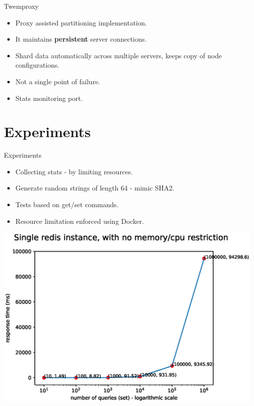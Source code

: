 \documentclass{beamer}
\begin{document}
\begin{frame}{Twemproxy}
\begin{itemize}
    \item Proxy assisted partitioning implementation.
    \item It maintains \textbf{persistent} server connections.
    \item Shard data automatically across multiple servers, keeps copy of node configurations.
    \item Not a single point of failure.
    \item Stats monitoring port.
\end{itemize}
\end{frame}

\section{Experiments}

\begin{frame}{Experiments}
\begin{itemize}
    \item Collecting stats - by limiting resources.
    \item Generate random strings of length 64 - mimic SHA2.
    \item Tests based on get/set commands.
    \item Resource limitation enforced using Docker.
\end{itemize}
\end{frame}


\begin{frame}
    \includegraphics[width=\textwidth]{fig1.eps}
\end{frame}
\end{document}
